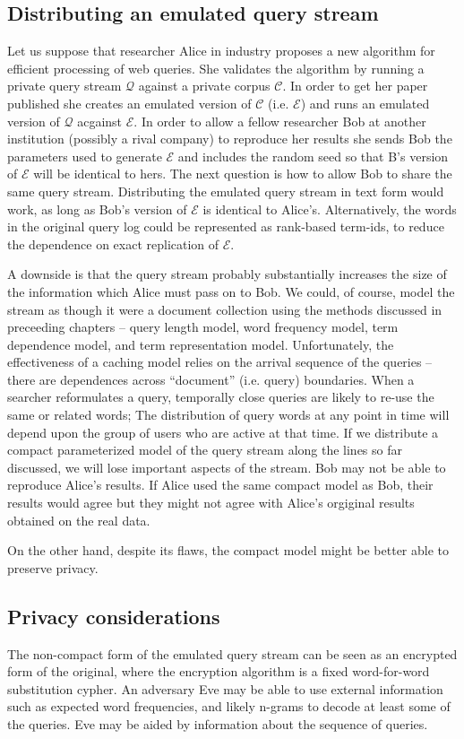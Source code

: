 \documentclass[11pt]{report}
\newcommand{\script}[1]{$\mathcal{#1}$}
\begin{document}
\subsection{Distributing an emulated query stream}
Let us suppose that researcher Alice in industry proposes a new algorithm
for efficient processing of web queries.  She validates the algorithm by
running a private query stream \script{Q} against a private corpus
\script{C}.  In order to get her paper published she creates an
emulated version of \script{C} (i.e. \script{E}) and runs an emulated
version of \script{Q} acgainst \script{E}.  In order to allow a fellow
researcher Bob at another institution (possibly a rival company) to
reproduce her results she
sends Bob the parameters used to generate \script{E} and includes the
random seed so that B's version of \script{E} will be identical to
hers.  The next question is how to allow Bob to share the same query
stream.  Distributing the emulated query stream in text form would work, as long as
Bob's version of \script{E} is identical to Alice's.  Alternatively,
the words in the original query log could be represented as rank-based
term-ids, to reduce the dependence on exact replication of \script{E}.

A downside is that the query stream probably substantially increases the
size of the information which Alice must pass on to Bob.  We could, of course,
model the stream as though it were a document collection using the
methods discussed in preceeding chapters -- query length model, word
frequency model, term dependence model, and term representation model.
Unfortunately, the effectiveness of a caching model relies on the
arrival sequence of the queries -- there are dependences across
``document'' (i.e. query) boundaries.  When a searcher reformulates a query,
temporally close queries are likely to re-use the same or related
words; The distribution of query words at any point in time will
depend upon the group of users who are active at that time.  If we
distribute a compact parameterized model of the query stream along the
lines so far discussed, we will
lose important aspects of the stream.  Bob may not be able to
reproduce Alice's results.  If Alice used the same compact model
as Bob, their results would agree but they might not agree with
Alice's orgiginal results obtained on the real data.


On the other hand, despite its flaws, the compact model might be
better able to preserve privacy.  


\subsection{Privacy considerations}
The non-compact form of the emulated query stream can be seen as an encrypted form
of the original, where the encryption algorithm is a fixed
word-for-word substitution cypher.  An adversary Eve may be able to
use external information such as expected word frequencies, and
likely n-grams to decode at least some of the queries.   Eve
may be aided by information about the sequence of queries.
\end{document}
